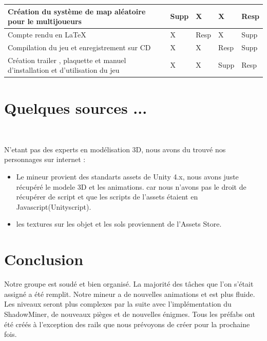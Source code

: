 \documentclass[titlepage, 13px, a4paper]{report}
\begin{document}
{\begin{tabular}{|p{6cm}|p{1.2cm}|p{1.2cm}|p{1.2cm}|p{1.2cm}|}
		\hline
		Création du système de map aléatoire pour le multijoueurs & Supp\footnotemark[2] & X & X & Resp\footnotemark[1] \\
		\hline
		Compte rendu en \LaTeX & X & Resp\footnotemark[1] & X & Supp\footnotemark[2]  \\
		\hline
		Compilation du jeu et enregistrement sur CD & X & X & Resp\footnotemark[1] & Supp\footnotemark[2] \\
		\hline
		Création trailer , plaquette et manuel d'installation et d'utilisation du jeu & X & X & Supp\footnotemark[2] & Resp\footnotemark[1] \\
		\hline
	\end{tabular}
	\label{repartition}		
}





\newpage
{}
\part{Quelques sources ...}
\paragraph{} \hspace{0pt} \\ 
N'etant pas des experts en modélisation 3D, nous avons du trouvé nos personnages sur internet : 
{\begin{itemize}
	\item Le mineur provient des standarts assets de Unity 4.x, nous avons juste récupéré le modele 3D et les animations. 
	car nous n'avons pas le droit de récupérer de script et que les scripts de l'assets étaient en Javascript(Unityscript).
	\item les textures sur les objet et les sols proviennent de l'Assets Store.
\end{itemize}}






\newpage
{}
\part{Conclusion}
Notre groupe est soudé et bien organisé. La majorité des tâches que l’on s’était assigné a été remplit. 
Notre mineur a de nouvelles animations et est plus fluide. Les niveaux seront plus complexes par la suite avec l’implémentation du ShadowMiner, 
de nouveaux pièges et de nouvelles énigmes. Tous les préfabs ont été créés à l’exception des rails que nous prévoyons de créer pour la prochaine fois.  \\ \\
\end{document}
